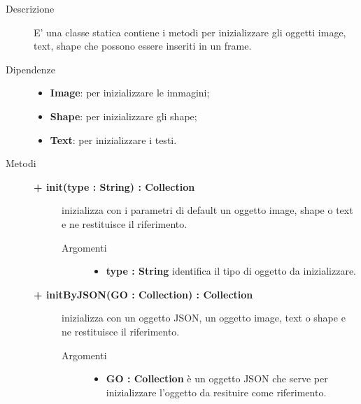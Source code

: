 \begin{description}
\item[Descrizione] \hfill
	E' una classe statica contiene i metodi per inizializzare gli oggetti image, text, shape che possono essere inseriti in un frame.
	
	\item[Dipendenze] \hfill
	\begin{itemize}
		\item \textbf{Image}: per inizializzare le immagini;
		\item \textbf{Shape}: per inizializzare gli shape;
		\item \textbf{Text}: per inizializzare i testi.
	\end{itemize}
	
\item[Metodi] \hfill

	\begin{description}
		\item[\textbf{\color{blue}+ init(type : String) : Collection			}] \hfill
			inizializza con i parametri di default un oggetto image, shape o text e ne restituisce il riferimento.
			
		\begin{description}
			\item[Argomenti] \hfill
				\begin{itemize}
				
					\item \textbf{type : String			} \hfill
					identifica il tipo di oggetto da inizializzare.
				\end{itemize}
		\end{description}

\end{description}

	\begin{description}
		\item[\textbf{\color{blue}+ initByJSON(GO : Collection) : Collection			}] \hfill
			inizializza con un oggetto JSON, un oggetto image, text o shape e ne restituisce il riferimento.
			
		\begin{description}
			\item[Argomenti] \hfill
				\begin{itemize}
				
					\item \textbf{GO : Collection			} \hfill
					è un oggetto JSON che serve per inizializzare l'oggetto da resituire come riferimento.
				\end{itemize}
		\end{description}

\end{description}

\end{description}

